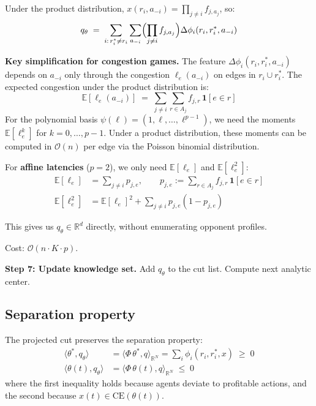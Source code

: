 \documentclass[11pt]{article}
\newcommand{\bigO}{\mathcal{O}}
\newcommand{\R}{\mathbb{R}}
\newcommand{\CE}{\mathrm{CE}}
\begin{document}
Under the product distribution, $x(r_i, a_{-i}) = \prod_{j \neq i} f_{j, a_j}$, so:
\[
q_\theta \;=\; \sum_{i:\, r_i^* \neq r_i} \sum_{a_{-i}} \Bigl(\prod_{j \neq i} f_{j, a_j}\Bigr) \Delta\phi_i(r_i, r_i^*, a_{-i})
\]

\textbf{Key simplification for congestion games.} The feature $\Delta\phi_i(r_i, r_i^*, a_{-i})$ depends on $a_{-i}$ only through the congestion $\ell_e(a_{-i})$ on edges in $r_i \cup r_i^*$. The expected congestion under the product distribution is:
\[
\mathbb{E}[\ell_e(a_{-i})] \;=\; \sum_{j \neq i} \sum_{r \in A_j} f_{j,r}\, \mathbf{1}[e \in r]
\]
For the polynomial basis $\psi(\ell) = (1, \ell, \ldots, \ell^{p-1})$, we need the moments $\mathbb{E}[\ell_e^k]$ for $k = 0, \ldots, p-1$. Under a product distribution, these moments can be computed in $\bigO(n)$ per edge via the Poisson binomial distribution.

For \textbf{affine latencies} ($p=2$), we only need $\mathbb{E}[\ell_e]$ and $\mathbb{E}[\ell_e^2]$:
\begin{align*}
\mathbb{E}[\ell_e] &= \sum_{j \neq i} p_{j,e}, \qquad p_{j,e} := \sum_{r \in A_j} f_{j,r}\,\mathbf{1}[e \in r] \\
\mathbb{E}[\ell_e^2] &= \mathbb{E}[\ell_e]^2 + \sum_{j \neq i} p_{j,e}(1 - p_{j,e})
\end{align*}

This gives us $q_\theta \in \R^d$ directly, without enumerating opponent profiles.

Cost: $\bigO(n \cdot K \cdot p)$.

\medskip
\textbf{Step 7: Update knowledge set.} Add $q_\theta$ to the cut list. Compute next analytic center.

\subsection{Separation property}

The projected cut preserves the separation property:
\begin{align*}
\langle \theta^*, q_\theta \rangle &= \langle \Phi\,\theta^*, q \rangle_{\R^N} = \sum_i \phi_i(r_i, r_i^*, x) \;\geq\; 0 \\
\langle \theta(t), q_\theta \rangle &= \langle \Phi\,\theta(t), q \rangle_{\R^N} \;\leq\; 0
\end{align*}
where the first inequality holds because agents deviate to profitable actions, and the second because $x(t) \in \CE(\theta(t))$.

\end{document}
